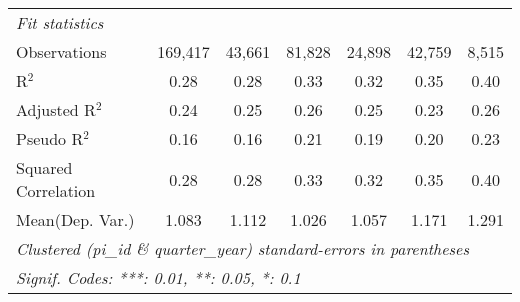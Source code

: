 \begin{tabular}{lcccccc}
   \midrule
   \emph{Fit statistics}\\
   Observations                                               & 169,417       & 43,661       & 81,828       & 24,898       & 42,759        & 8,515\\  
   R$^2$                                                      & 0.28          & 0.28         & 0.33         & 0.32         & 0.35          & 0.40\\  
   Adjusted R$^2$                                             & 0.24          & 0.25         & 0.26         & 0.25         & 0.23          & 0.26\\  
   Pseudo R$^2$                                               & 0.16          & 0.16         & 0.21         & 0.19         & 0.20          & 0.23\\  
   Squared Correlation                                        & 0.28          & 0.28         & 0.33         & 0.32         & 0.35          & 0.40\\  
Mean(Dep. Var.) & 1.083 & 1.112 & 1.026 & 1.057 & 1.171 & 1.291 \\
   \midrule \midrule
   \multicolumn{7}{l}{\emph{Clustered (pi\_id \& quarter\_year) standard-errors in parentheses}}\\
   \multicolumn{7}{l}{\emph{Signif. Codes: ***: 0.01, **: 0.05, *: 0.1}}\\
\end{tabular}
\par\endgroup
